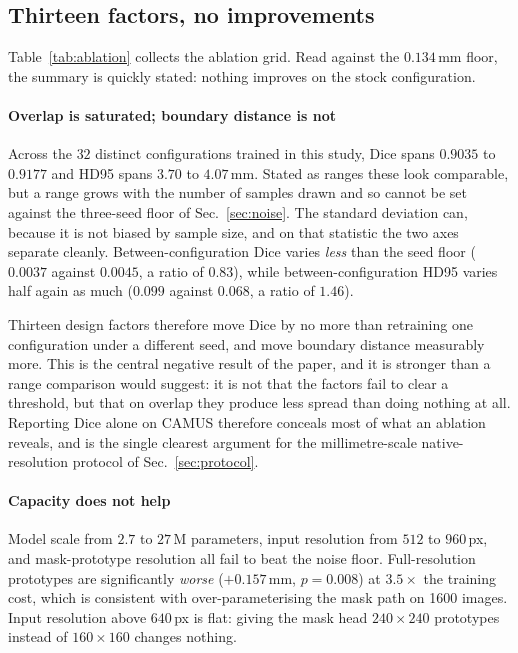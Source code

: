 \subsection{Thirteen factors, no improvements}

Table~\ref{tab:ablation} collects the ablation grid. Read against the
$0.134$\,mm floor, the summary is quickly stated: nothing improves on the stock
configuration.



\paragraph{Overlap is saturated; boundary distance is not} Across the $32$
distinct configurations trained in this study, Dice spans $0.9035$ to $0.9177$
and HD95 spans $3.70$ to $4.07$\,mm. Stated as ranges these look comparable, but
a range grows with the number of samples drawn and so cannot be set against the
three-seed floor of Sec.~\ref{sec:noise}. The standard deviation can, because it
is not biased by sample size, and on that statistic the two axes separate
cleanly. Between-configuration Dice varies \emph{less} than the seed floor
($0.0037$ against $0.0045$, a ratio of $0.83$), while between-configuration HD95
varies half again as much ($0.099$ against $0.068$, a ratio of $1.46$).

Thirteen design factors therefore move Dice by no more than retraining one
configuration under a different seed, and move boundary distance measurably
more. This is the central negative result of the paper, and it is stronger than
a range comparison would suggest: it is not that the factors fail to clear a
threshold, but that on overlap they produce less spread than doing nothing at
all. Reporting Dice alone on CAMUS therefore conceals most of what an ablation
reveals, and is the single clearest argument for the millimetre-scale
native-resolution protocol of Sec.~\ref{sec:protocol}.

\paragraph{Capacity does not help} Model scale from $2.7$ to $27$\,M parameters,
input resolution from $512$ to $960$\,px, and mask-prototype resolution all fail
to beat the noise floor. Full-resolution prototypes are significantly
\emph{worse} ($+0.157$\,mm, $p{=}0.008$) at $3.5\times$ the training cost, which
is consistent with over-parameterising the mask path on 1600 images. Input
resolution above $640$\,px is flat: giving the mask head $240\times240$
prototypes instead of $160\times160$ changes nothing.

